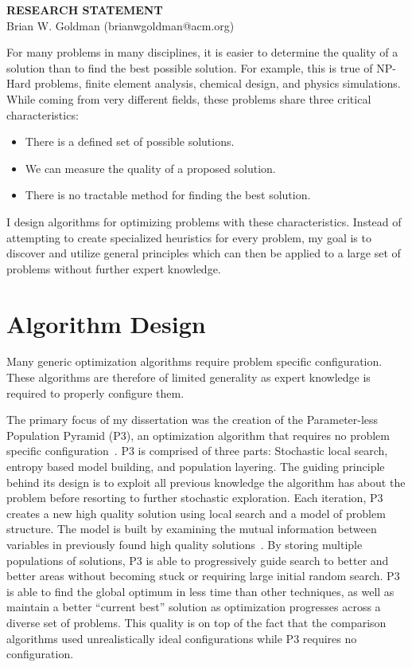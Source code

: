 \documentclass[a4paper, 11pt]{article}
\begin{document}
\thispagestyle{empty}

\pagestyle{fancy}

\begin{center}
{\LARGE \bf RESEARCH STATEMENT}\\
\vspace*{0.1cm}
{\normalsize Brian W. Goldman (brianwgoldman@acm.org)}
\end{center}

\noindent
For many problems in many disciplines, it is easier to determine the quality of a solution
than to find the best possible solution. For example, this is true of NP-Hard problems,
finite element analysis, chemical design, and physics simulations.
While coming from very different fields, these problems share
three critical characteristics:
\begin{itemize}
\item There is a defined set of possible solutions.
\item We can measure the quality of a proposed solution.
\item There is no tractable method for finding the best solution.
\end{itemize}
I design algorithms for optimizing problems with these characteristics. Instead of
attempting to create specialized heuristics for every problem,
my goal is to discover and utilize general principles which can
then be applied to a large set of problems without further expert knowledge.

\section{Algorithm Design}
Many generic optimization algorithms require problem specific
configuration. These algorithms are therefore of limited generality
as expert knowledge is required to properly configure them.

The primary focus of my dissertation was the creation of the
Parameter-less Population Pyramid (P3), an optimization algorithm
that requires no problem specific configuration~\cite{goldman:2014:p3,goldman:2015:fastp3}.
P3 is comprised of three parts: Stochastic local search, entropy based model building, and
population layering. The guiding principle behind its design is to exploit all previous
knowledge the algorithm has about the problem before resorting to further stochastic exploration.
Each iteration, P3 creates a new high quality solution using local search and a model of
problem structure. The model is built by examining the mutual information between variables
in previously found high quality solutions~\cite{goldman:2012:ltga}.
By storing multiple populations of solutions, P3 is able to progressively guide search
to better and better areas without becoming stuck or requiring large initial random search.
P3 is able to find the global optimum in less time than other techniques, as well as
maintain a better ``current best'' solution as optimization progresses across a diverse set of problems.
This quality is on top
of the fact that the comparison algorithms used unrealistically ideal configurations while
P3 requires no configuration.
\end{document}
